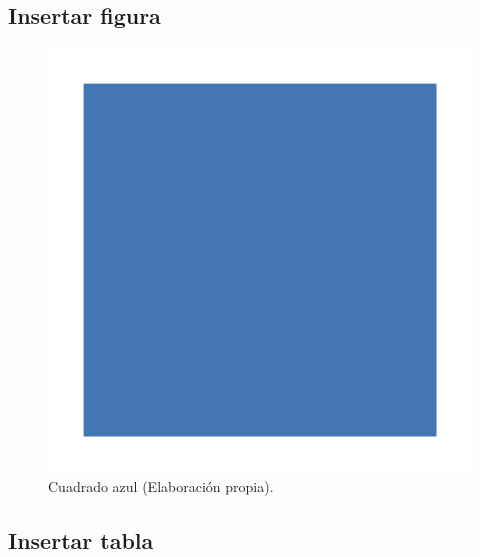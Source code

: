 \subsection{Insertar figura}

\begin{figure}[h]                             %
  \centering                                  %
  \includegraphics[scale=0.5]{cuadrado-azul}  %
  \caption[Cuadrado azul]{Cuadrado azul (Elaboración propia).} %
  \label{fig:figura01}                        %
\end{figure}

\subsection{Insertar tabla}

